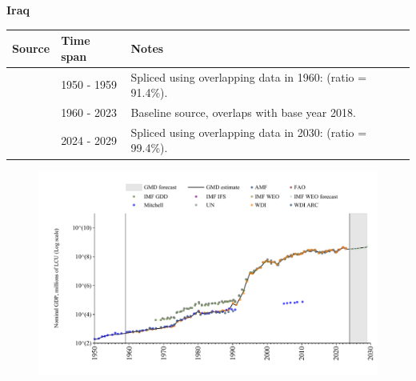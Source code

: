 \documentclass[12pt,a4paper,landscape]{article}
\begin{document}
\begin{adjustbox}{max totalsize={\paperwidth}{\paperheight},center}
\begin{minipage}[t][\textheight][t]{\textwidth}
\vspace*{0.5cm}
{}
\begin{center}
{\Large\bfseries Iraq}
\end{center}
\vspace{0.5cm}
\begin{table}[H]
\centering
\small
\begin{tabular}{|l|l|l|}
\hline
\textbf{Source} & \textbf{Time span} & \textbf{Notes} \\
\hline
\rowcolor{white}\cite{Mitchell}& 1950 - 1959 &Spliced using overlapping data in 1960: (ratio = 91.4\%).\\
\rowcolor{lightgray}\cite{WDI}& 1960 - 2023 &Baseline source, overlaps with base year 2018.\\
\rowcolor{white}\cite{IMF_WEO_forecast}& 2024 - 2029 &Spliced using overlapping data in 2030: (ratio = 99.4\%).\\
\hline
\end{tabular}
\end{table}
\begin{figure}[H]
\centering
\includegraphics[width=\textwidth,height=0.6\textheight,keepaspectratio]{graphs/IRQ_nGDP.pdf}
\end{figure}
\end{minipage}
\end{adjustbox}
\end{document}
